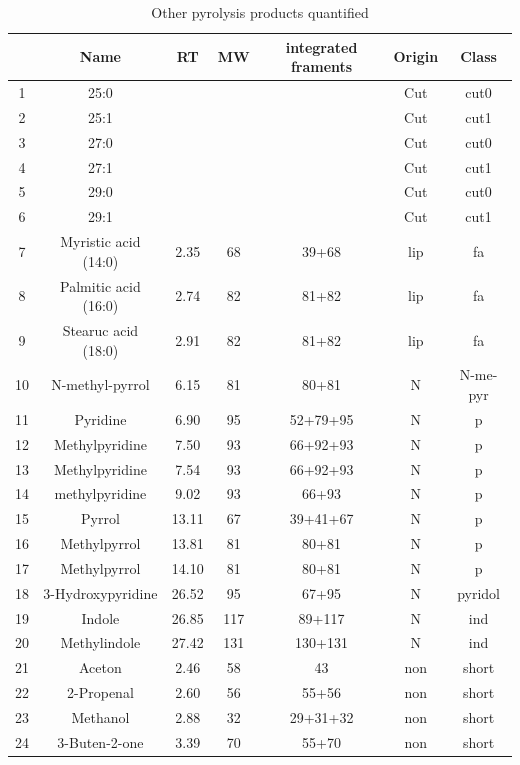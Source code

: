 \documentclass[preprint,review,12pt]{elsarticle}
\begin{document}
\newpage
\begin{table}[h!]
\begin{center}
\caption{Other pyrolysis products quantified}
\label{tab:nprod}
{\tiny
\begin{tabular}{ccccccc}
  \hline
 & Name & RT & MW & integrated framents & Origin & Class \\ 
  \hline
1 & 25:0 &  &  &  & Cut & cut0 \\ 
  2 & 25:1 &  &  &  & Cut & cut1 \\ 
  3 & 27:0 &  &  &  & Cut & cut0 \\ 
  4 & 27:1 &  &  &  & Cut & cut1 \\ 
  5 & 29:0 &  &  &  & Cut & cut0 \\ 
  6 & 29:1 &  &  &  & Cut & cut1 \\ 
  7 & Myristic acid (14:0) & 2.35 & 68 & 39+68 & lip & fa \\ 
  8 & Palmitic acid (16:0) & 2.74 & 82 & 81+82 & lip & fa \\ 
  9 & Stearuc acid (18:0) & 2.91 & 82 & 81+82 & lip & fa \\ 
  10 & N-methyl-pyrrol & 6.15 & 81 & 80+81 & N & N-me-pyr \\ 
  11 & Pyridine & 6.90 & 95 & 52+79+95 & N & p \\ 
  12 & Methylpyridine & 7.50 & 93 & 66+92+93 & N & p \\ 
  13 & Methylpyridine & 7.54 & 93 & 66+92+93 & N & p \\ 
  14 & methylpyridine & 9.02 & 93 & 66+93 & N & p \\ 
  15 & Pyrrol & 13.11 & 67 & 39+41+67 & N & p \\ 
  16 & Methylpyrrol & 13.81 & 81 & 80+81 & N & p \\ 
  17 & Methylpyrrol & 14.10 & 81 & 80+81 & N & p \\ 
  18 & 3-Hydroxypyridine & 26.52 & 95 & 67+95 & N & pyridol \\ 
  19 & Indole & 26.85 & 117 & 89+117 & N & ind \\ 
  20 & Methylindole & 27.42 & 131 & 130+131 & N & ind \\ 
  21 & Aceton & 2.46 & 58 & 43 & non & short \\ 
  22 & 2-Propenal & 2.60 & 56 & 55+56 & non & short \\ 
  23 & Methanol & 2.88 & 32 & 29+31+32 & non & short \\ 
  24 & 3-Buten-2-one & 3.39 & 70 & 55+70 & non & short \\ 

\end{tabular}}
\end{center}
\end{table}
\end{document}
